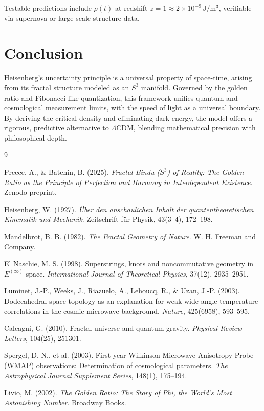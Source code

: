 \documentclass[12pt,a4paper]{article}
\begin{document}
Testable predictions include \(\rho(t)\) at redshift \(z = 1 \approx 2 \times 10^{-9}\,\mathrm{J/m^3}\), verifiable via supernova or large-scale structure data.

\section{Conclusion}

Heisenberg's uncertainty principle is a universal property of space-time, arising from its fractal structure modeled as an \(S^3\) manifold. Governed by the golden ratio and Fibonacci-like quantization, this framework unifies quantum and cosmological measurement limits, with the speed of light as a universal boundary. By deriving the critical density and eliminating dark energy, the model offers a rigorous, predictive alternative to \(\Lambda\)CDM, blending mathematical precision with philosophical depth.

\begin{thebibliography}{9}

Preece, A., \& Batenin, B. (2025). \textit{Fractal Bindu (\(S^3\)) of Reality: The Golden Ratio as the Principle of Perfection and Harmony in Interdependent Existence}. Zenodo preprint.

Heisenberg, W. (1927). \textit{Über den anschaulichen Inhalt der quantentheoretischen Kinematik und Mechanik}. Zeitschrift für Physik, 43(3--4), 172--198.

Mandelbrot, B. B. (1982). \textit{The Fractal Geometry of Nature}. W. H. Freeman and Company.

El Naschie, M. S. (1998). Superstrings, knots and noncommutative geometry in \(E^{(\infty)}\) space. \textit{International Journal of Theoretical Physics}, 37(12), 2935--2951.

Luminet, J.-P., Weeks, J., Riazuelo, A., Lehoucq, R., \& Uzan, J.-P. (2003). Dodecahedral space topology as an explanation for weak wide-angle temperature correlations in the cosmic microwave background. \textit{Nature}, 425(6958), 593--595.

Calcagni, G. (2010). Fractal universe and quantum gravity. \textit{Physical Review Letters}, 104(25), 251301.

Spergel, D. N., et al. (2003). First-year Wilkinson Microwave Anisotropy Probe (WMAP) observations: Determination of cosmological parameters. \textit{The Astrophysical Journal Supplement Series}, 148(1), 175--194.

Livio, M. (2002). \textit{The Golden Ratio: The Story of Phi, the World's Most Astonishing Number}. Broadway Books.

\end{thebibliography}
\end{document}

